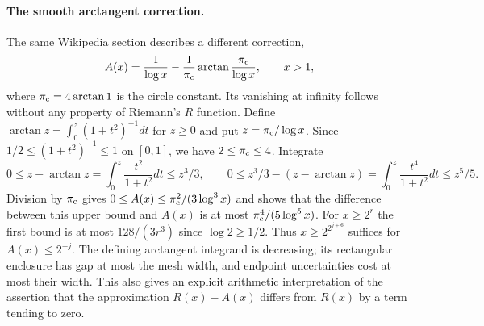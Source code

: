 \paragraph{The smooth arctangent correction.}
The same Wikipedia section describes a different correction,
\[
 A(x)=\frac{1}{\log x}-\frac1{\pi_{\rm c}}\arctan\frac{\pi_{\rm c}}{\log x},
 \qquad x>1,
\]
where $\pi_{\rm c}=4\arctan 1$ is the circle constant. Its vanishing at infinity follows without any property of Riemann's $R$ function. Define $\arctan z=\int_0^z(1+t^2)^{-1}dt$ for $z\ge0$ and put $z=\pi_{\rm c}/\log x$. Since $1/2\le(1+t^2)^{-1}\le1$ on $[0,1]$, we have $2\le\pi_{\rm c}\le4$. Integrate
\[
 0\le z-\arctan z=\int_0^z\frac{t^2}{1+t^2}dt\le z^3/3,
 \qquad
 0\le z^3/3-(z-\arctan z)=\int_0^z\frac{t^4}{1+t^2}dt\le z^5/5.
\]
Division by $\pi_{\rm c}$ gives $0\le A(x)\le\pi_{\rm c}^2/(3\log^3 x)$ and shows that the difference between this upper bound and $A(x)$ is at most $\pi_{\rm c}^4/(5\log^5 x)$. For $x\ge2^r$ the first bound is at most $128/(3r^3)$ since $\log2\ge1/2$. Thus $x\ge2^{2^{j+6}}$ suffices for $A(x)\le2^{-j}$. The defining arctangent integrand is decreasing; its rectangular enclosure has gap at most the mesh width, and endpoint uncertainties cost at most their width. This also gives an explicit arithmetic interpretation of the assertion that the approximation $R(x)-A(x)$ differs from $R(x)$ by a term tending to zero.
